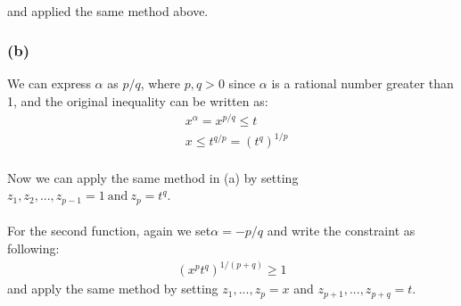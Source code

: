 \paragraph{}
and applied the same method above.
\subsubsection*{(b)}
We can express $\alpha$ as $p/q$, where $p,q>0$ since $\alpha$ is a rational number greater than 1, and the original inequality can be written as:
\begin{align*}
&x^{\alpha} = x^{p/q} \leq t \\
&x \leq t^{q/p} = (t^q)^{1/p}
\end{align*}
\paragraph{}
Now we can apply the same method in (a) by setting $z_1, z_2,...,z_{p-1} = 1\ \text{and}\ z_p =t^q$.
\paragraph{}
For the second function, again we set$\alpha = -p/q$ and write the constraint as following:
\begin{align*}
(x^pt^q)^{1/(p+q)} \geq 1
\end{align*}
and apply the same method by setting $z_1,...,z_p = x$ and $z_{p+1},...,z_{p+q} = t$.